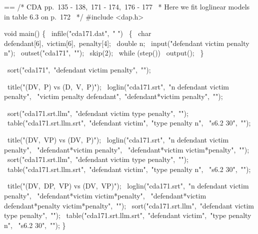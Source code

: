 \documentclass{book}
\makeatletter
\newenvironment{Texinfopreformatted}{%
  \par\GNUTobeylines\obeyspaces\frenchspacing\parskip=\z@\parindent=\z@}{}
{\catcode`\^^M=13 \gdef\GNUTobeylines{\catcode`\^^M=13 \def^^M{\null\par}}}
\newenvironment{Texinfoindented}{\begin{list}{}{}\item\relax}{\end{list}}
\renewcommand{\_}{\Texinfounderscore\discretionary{}{}{}}
\makeatother
\begin{document}
\begin{Texinfoindented}
\begin{Texinfopreformatted}%
\ttfamily /* CDA pp.\ 135 - 138,\ 171 - 174,\ 176 - 177
\ * Here we fit loglinear models in table 6.3 on p.\ 172
\ */
\#include <dap.h>

void main()
\{
\  infile("cda171.dat",\ " ")
\    \{
\      char defendant[6],\ victim[6],\ penalty[4];
\      double n;
\      input("defendant victim penalty n");
\      outset("cda171",\ "");
\      skip(2);
\      while (step())
\        output();
\    \}

\  sort("cda171",\ "defendant victim penalty",\ "");

\  title("(DV,\ P) vs (D,\ V,\ P)");
\  loglin("cda171.srt",\ "n defendant victim penalty",
\         "victim penalty defendant",\ "defendant*victim penalty",\ "");

\  sort("cda171.srt.llm",\ "defendant victim \_type\_ penalty",\ "");
\  table("cda171.srt.llm.srt",\ "defendant victim",\ "\_type\_ penalty n",
\        "s6.2 30",\ "");

\  title("(DV,\ VP) vs (DV,\ P)");
\  loglin("cda171.srt",\ "n defendant victim penalty",
\         "defendant*victim penalty",
\         "defendant*victim victim*penalty",\ "");
\  sort("cda171.srt.llm",\ "defendant victim \_type\_ penalty",\ "");
\  table("cda171.srt.llm.srt",\ "defendant victim",\ "\_type\_ penalty n",
\        "s6.2 30",\ "");

\  title("(DV,\ DP,\ VP) vs (DV,\ VP)");
\  loglin("cda171.srt",\ "n defendant victim penalty",
\         "defendant*victim victim*penalty",
\         "defendant*victim defendant*penalty victim*penalty",\ "");
\  sort("cda171.srt.llm",\ "defendant victim \_type\_ penalty",\ "");
\  table("cda171.srt.llm.srt",\ "defendant victim",\ "\_type\_ penalty n",
\        "s6.2 30",\ "");
\}

\end{Texinfopreformatted}
\end{Texinfoindented}
\end{document}
